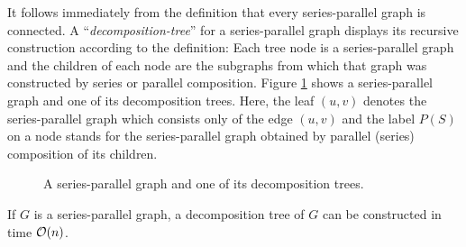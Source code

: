 It follows immediately from the definition that every series-parallel graph is connected. A ``\textit{decomposition-tree}'' for a series-parallel graph displays its recursive construction according to the definition: Each tree node is a series-parallel graph and the children of each node are the subgraphs from which that graph was constructed by series or parallel composition. Figure \ref{fig:spdecomposition} shows a series-parallel graph and one of its decomposition trees. Here, the leaf $(u, v)$ denotes the series-parallel graph which consists only of the edge $(u, v)$ and the label $P(S)$ on a node stands for the series-parallel graph obtained by parallel (series) composition of its children.

\begin{figure}[H]
	\centering
	\begin{minipage}[t]{.39\linewidth}
		\centering
	\end{minipage}
	\begin{minipage}[t]{.60\linewidth}
	\end{minipage}
	\caption{A series-parallel graph and one of its decomposition trees.}
	\label{fig:spdecomposition}
\end{figure}

\begin{lemma}
	\label{lemma:spdecomposition}
	If $G$ is a series-parallel graph, a decomposition tree of $G$ can be constructed in time $\mathcal{O}(n)$.
\end{lemma}

